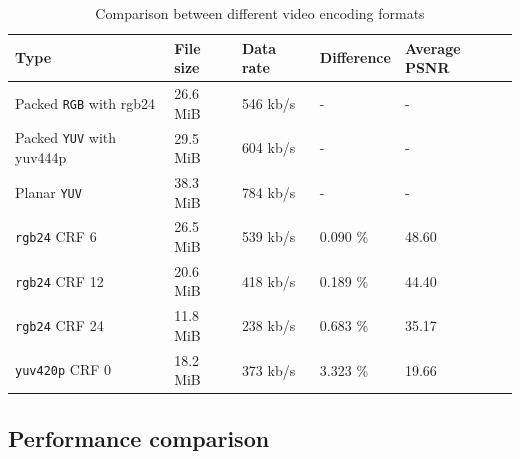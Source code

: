 \begin{table}[t]
  \centering
  \begin{tabular}{l|l|l|l|l}
    \hline
    \textbf{Type} & \textbf{File size} & \textbf{Data rate} & \textbf{Difference} & \textbf{Average PSNR} \\ \hline
    \hline
    Packed \texttt{RGB} with rgb24     & 26.6 MiB  & 546 kb/s  & -         & -         \\ \hline
    Packed \texttt{YUV} with yuv444p    & 29.5 MiB  & 604 kb/s  & -         & -         \\ \hline
    Planar \texttt{YUV}     & 38.3 MiB  & 784 kb/s  & -         & -         \\ \hline
    \hline
    \texttt{rgb24} CRF 6    & 26.5 MiB  & 539 kb/s  & 0.090 \%  & 48.60     \\ \hline
    \texttt{rgb24} CRF 12   & 20.6 MiB  & 418 kb/s  & 0.189 \%  & 44.40     \\ \hline
    \texttt{rgb24} CRF 24   & 11.8 MiB  & 238 kb/s  & 0.683 \%  & 35.17     \\ \hline
    \texttt{yuv420p} CRF 0  & 18.2 MiB  & 373 kb/s  & 3.323 \%  & 19.66     \\ \hline
  \end{tabular}
  \caption{\footnotesize Comparison between different video encoding formats}
  \label{tbl:video_format}
\end{table}

\subsection{Performance comparison}

